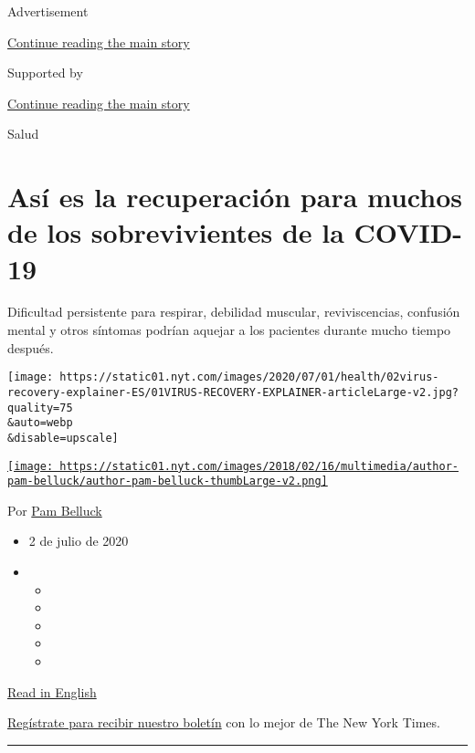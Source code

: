 Advertisement

\protect\hyperlink{after-top}{Continue reading the main story}

Supported by

\protect\hyperlink{after-sponsor}{Continue reading the main story}

Salud

\hypertarget{asuxed-es-la-recuperaciuxf3n-para-muchos-de-los-sobrevivientes-de-la-covid-19}{%
\section{Así es la recuperación para muchos de los sobrevivientes de la
COVID-19}\label{asuxed-es-la-recuperaciuxf3n-para-muchos-de-los-sobrevivientes-de-la-covid-19}}

Dificultad persistente para respirar, debilidad muscular,
reviviscencias, confusión mental y otros síntomas podrían aquejar a los
pacientes durante mucho tiempo después.

\texttt{[image: https://static01.nyt.com/images/2020/07/01/health/02virus-recovery-explainer-ES/01VIRUS-RECOVERY-EXPLAINER-articleLarge-v2.jpg?quality=75\\\&auto=webp\\\&disable=upscale]}

\href{https://www.nytimes.com/by/pam-belluck}{\texttt{[image: https://static01.nyt.com/images/2018/02/16/multimedia/author-pam-belluck/author-pam-belluck-thumbLarge-v2.png]}}

Por \href{https://www.nytimes.com/by/pam-belluck}{Pam Belluck}

\begin{itemize}
\item
  2 de julio de 2020
\item
  \begin{itemize}
  \item
  \item
  \item
  \item
  \item
  \end{itemize}
\end{itemize}

\href{https://www.nytimes.com/2020/07/01/health/coronavirus-recovery-survivors.html}{Read
in English}

\href{https://www.nytimes.com/newsletters/el-times}{Regístrate para
recibir nuestro boletín} con lo mejor de The New York Times.

\begin{center}\rule{0.5\linewidth}{\linethickness}\end{center}

